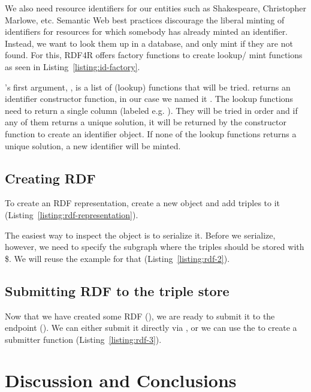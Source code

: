 We also need resource identifiers for our entities such as Shakespeare, Christopher Marlowe, etc. Semantic Web best practices discourage the liberal minting of identifiers for resources for which somebody has already minted an identifier. Instead, we want to look them up in a database, and only mint if they are not found. For this, RDF4R offers factory functions to create lookup/ mint functions as seen in Listing~\ref{listing:id-factory}.

's first argument, , is a list of (lookup) functions that will be tried.  returns an identifier constructor function, in our case we named it . The lookup functions need to return a single column (labeled e.g. ). They will be tried in order and if any of them returns a unique solution, it will be returned by the constructor function to create an identifier object. If none of the lookup functions returns a unique solution, a new identifier will be minted. 

\subsection{Creating RDF}

To create an RDF representation, create a new  object and add triples to it (Listing~\ref{listing:rdf-representation}).

The easiest way to inspect the  object is to serialize it. Before we serialize, however, we need to specify the subgraph where the triples should be stored with \$. We will reuse the example for that (Listing~\ref{listing:rdf-2}).


\subsection{Submitting RDF to the triple store}

Now that we have created some RDF (), we are ready to submit it to the endpoint (). We can either submit it directly via , or we can use the  to create a submitter function (Listing~\ref{listing:rdf-3}).



\section{Discussion and Conclusions}


